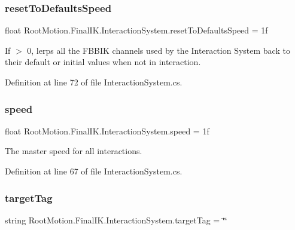 \subsubsection{\texorpdfstring{reset\+To\+Defaults\+Speed}{resetToDefaultsSpeed}}
{\footnotesize\ttfamily float Root\+Motion.\+Final\+I\+K.\+Interaction\+System.\+reset\+To\+Defaults\+Speed = 1f}



If $>$ 0, lerps all the F\+B\+B\+IK channels used by the Interaction System back to their default or initial values when not in interaction. 



Definition at line 72 of file Interaction\+System.\+cs.

\mbox{\label{class_root_motion_1_1_final_i_k_1_1_interaction_system_a7858c5f88281cb0bf8c9b4f280435f81}} 
\subsubsection{\texorpdfstring{speed}{speed}}
{\footnotesize\ttfamily float Root\+Motion.\+Final\+I\+K.\+Interaction\+System.\+speed = 1f}



The master speed for all interactions. 



Definition at line 67 of file Interaction\+System.\+cs.

\mbox{\label{class_root_motion_1_1_final_i_k_1_1_interaction_system_ad4877732927593d9a26bc65f96bc817f}} 
\subsubsection{\texorpdfstring{target\+Tag}{targetTag}}
{\footnotesize\ttfamily string Root\+Motion.\+Final\+I\+K.\+Interaction\+System.\+target\+Tag = \char`\"{}\char`\"{}}



